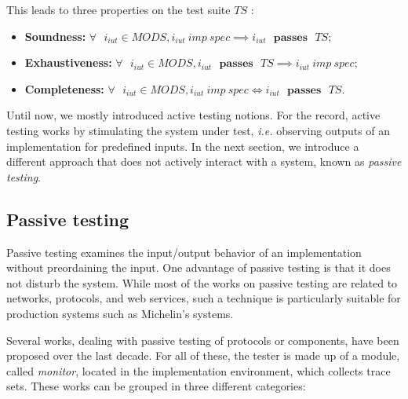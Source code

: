 This leads to three properties on the test suite $TS$
\cite{tretmans1996conformance}:

\begin{itemize}
\item \textbf{Soundness:} $\forall \text{ } i_{iut} \in MODS, i_{iut}
~imp~ spec \implies i_{iut} \text{ } \mathbf{passes} \text{ }
TS$;

\item \textbf{Exhaustiveness:} $\forall \text{ } i_{iut} \in MODS,
i_{iut} \text{ } \mathbf{passes} \text{ } TS \implies i_{iut} ~imp~
spec$;

\item \textbf{Completeness:} $\forall \text{ } i_{iut} \in MODS, i_{iut}
~imp~ spec \Leftrightarrow i_{iut} \text{ } \mathbf{passes}
\text{ } TS$.
\end{itemize}

Until now, we mostly introduced active testing notions. For the
record, active testing works by stimulating the system under
test, \emph{i.e.} observing outputs of an implementation for
predefined inputs. In the next section, we introduce a different
approach that does not actively interact with a system, known as
\emph{passive testing}.

\subsection{Passive testing}
\label{sec:related:testing:active-passive}

Passive testing examines the input/output behavior of an
implementation without preordaining the input. One advantage of
passive testing is that it does not disturb the system. While
most of the works on passive testing are related to networks,
protocols, and web services, such a technique is particularly
suitable for production systems such as Michelin's systems.

Several works, dealing with passive testing of protocols or
components, have been proposed over the last decade. For all of
these, the tester is made up of a module, called \emph{monitor},
located in the implementation environment, which collects trace
sets. These works can be grouped in three different categories:

